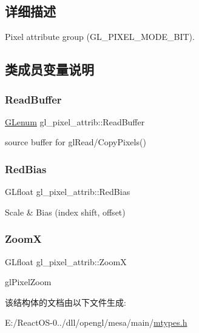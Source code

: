 \subsection{详细描述}
Pixel attribute group (G\+L\+\_\+\+P\+I\+X\+E\+L\+\_\+\+M\+O\+D\+E\+\_\+\+B\+IT). 

\subsection{类成员变量说明}
\mbox{\label{structgl__pixel__attrib_a0ce8b9d46b70ccb7b94a2349ca266764}} 
\subsubsection{\texorpdfstring{Read\+Buffer}{ReadBuffer}}
{\footnotesize\ttfamily \hyperlink{interfacevoid}{G\+Lenum} gl\+\_\+pixel\+\_\+attrib\+::\+Read\+Buffer}

source buffer for gl\+Read/\+Copy\+Pixels() \mbox{\label{structgl__pixel__attrib_a053f64153d7e277790516290cc749f0d}} 
\subsubsection{\texorpdfstring{Red\+Bias}{RedBias}}
{\footnotesize\ttfamily G\+Lfloat gl\+\_\+pixel\+\_\+attrib\+::\+Red\+Bias}

Scale \& Bias (index shift, offset) \mbox{\label{structgl__pixel__attrib_adf9a791b9962250e523b2ffc23550e1e}} 
\subsubsection{\texorpdfstring{ZoomX}{ZoomX}}
{\footnotesize\ttfamily G\+Lfloat gl\+\_\+pixel\+\_\+attrib\+::\+ZoomX}

gl\+Pixel\+Zoom 

该结构体的文档由以下文件生成\+:\begin{DoxyCompactItemize}
\item 
E\+:/\+React\+O\+S-\/0../dll/opengl/mesa/main/\hyperlink{mtypes_8h}{mtypes.\+h}\end{DoxyCompactItemize}
